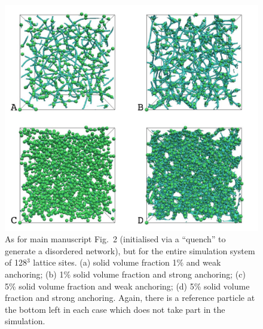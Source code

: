 \documentclass[12pt,twoside]{article}
\begin{document}
\begin{figure}
\includegraphics[scale=0.35]{s2.jpg}
\caption{As for main manuscript Fig.~2 (initialised via a ``quench''
to generate a disordered network), but for the entire simulation
system of 128$^3$ lattice sites. (a) solid volume fraction 1\% and
weak anchoring; (b) 1\% solid volume fraction and strong anchoring;
(c) 5\% solid volume fraction and weak anchoring; (d) 5\% solid
volume fraction and strong anchoring. Again, there is a reference
particle at the bottom left in each case which does not take part
in the simulation.}
\end{figure}
\end{document}

